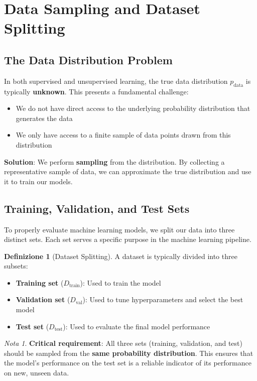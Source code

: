 \documentclass[11pt,a4paper]{article}
\theoremstyle{definition}
\newtheorem{definition}{Definizione}[section]
\theoremstyle{plain}
\theoremstyle{remark}
\newtheorem*{remark}{Nota}
\begin{document}
\section{Data Sampling and Dataset Splitting}

\subsection{The Data Distribution Problem}

In both supervised and unsupervised learning, the true data distribution $p_{\text{data}}$ is typically \textbf{unknown}. This presents a fundamental challenge:
\begin{itemize}
    \item We do not have direct access to the underlying probability distribution that generates the data
    \item We only have access to a finite sample of data points drawn from this distribution
\end{itemize}

\textbf{Solution}: We perform \textbf{sampling} from the distribution. By collecting a representative sample of data, we can approximate the true distribution and use it to train our models.

\subsection{Training, Validation, and Test Sets}

To properly evaluate machine learning models, we split our data into three distinct sets. Each set serves a specific purpose in the machine learning pipeline.

\begin{definition}[Dataset Splitting]
A dataset is typically divided into three subsets:
\begin{itemize}
    \item \textbf{Training set} ($D_{\text{train}}$): Used to train the model
    \item \textbf{Validation set} ($D_{\text{val}}$): Used to tune hyperparameters and select the best model
    \item \textbf{Test set} ($D_{\text{test}}$): Used to evaluate the final model performance
\end{itemize}
\end{definition}

\begin{remark}
\textbf{Critical requirement}: All three sets (training, validation, and test) should be sampled from the \textbf{same probability distribution}. This ensures that the model's performance on the test set is a reliable indicator of its performance on new, unseen data.
\end{remark}
\end{document}
